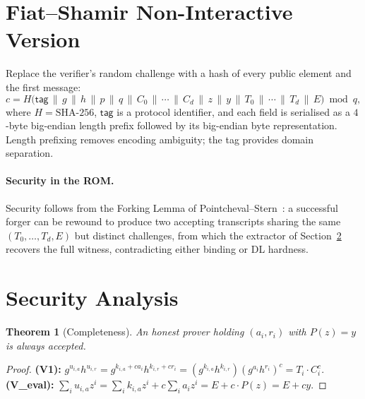 \documentclass[11pt,a4paper]{article}
\newtheorem{theorem}{Theorem}
\begin{document}
\section{Fiat--Shamir Non-Interactive Version}

Replace the verifier's random challenge with a hash of every public
element and the first message:
\[
c = H\bigl(\mathsf{tag} \,\|\, g \,\|\, h \,\|\, p \,\|\, q
\,\|\, C_0 \,\|\, \cdots \,\|\, C_d \,\|\, z \,\|\, y
\,\|\, T_0 \,\|\, \cdots \,\|\, T_d \,\|\, E\bigr) \bmod q,
\]
where $H=\mathrm{SHA\text{-}256}$, $\mathsf{tag}$ is a protocol
identifier, and each field is serialised as a $4$-byte big-endian length
prefix followed by its big-endian byte representation. Length prefixing
removes encoding ambiguity; the tag provides domain separation.

\paragraph{Security in the ROM.} Security follows from the Forking
Lemma of Pointcheval--Stern~\cite{ps2000}: a successful forger can be
rewound to produce two accepting transcripts sharing the same
$(T_0,\dots,T_d,E)$ but distinct challenges, from which the extractor
of Section~\ref{sec:security} recovers the full witness, contradicting
either binding or DL hardness.

\section{Security Analysis}\label{sec:security}

\begin{theorem}[Completeness]
An honest prover holding $(a_i,r_i)$ with $P(z)=y$ is always accepted.
\end{theorem}
\begin{proof}
\textbf{(V1):} $g^{u_{i,a}}h^{u_{i,r}} = g^{k_{i,a}+ca_i}h^{k_{i,r}+cr_i}
= (g^{k_{i,a}}h^{k_{i,r}})(g^{a_i}h^{r_i})^{c} = T_i\cdot C_i^{c}$.
\textbf{(V\_eval):} $\sum_i u_{i,a}z^{i} = \sum_i k_{i,a}z^{i}
+ c\sum_i a_i z^{i} = E + c\cdot P(z) = E + cy$.
\end{proof}
\end{document}

